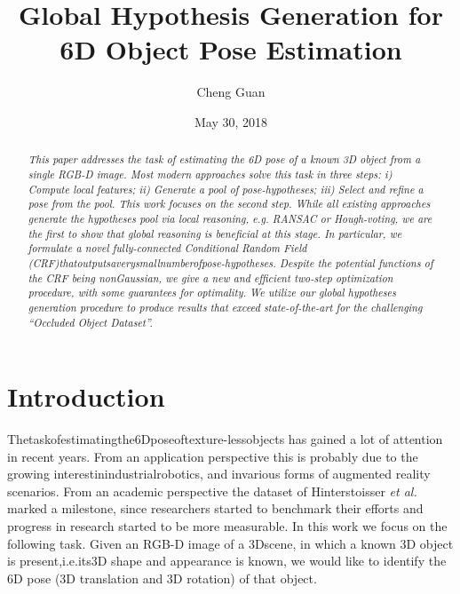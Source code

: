 \documentclass[10pt,twocolumn,a4paper]{article}
\title{Global Hypothesis Generation for 6D Object Pose Estimation}
\author{Cheng Guan}
\date{May 30, 2018}
\begin{document}
\maketitle
\begin{abstract}
  \emph{This paper addresses the task of estimating the 6D pose of a known 3D object
  from a single RGB-D image. Most modern approaches solve this task in three steps:
   i) Compute local features; ii) Generate a pool of pose-hypotheses; iii)
   Select and reﬁne a pose from the pool. This work focuses on the second step.
   While all existing approaches generate the hypotheses pool via local reasoning,
   e.g. RANSAC or Hough-voting, we are the ﬁrst to show that global reasoning
    is beneﬁcial at this stage. In particular, we formulate a novel fully-connected
     Conditional Random Field (CRF)thatoutputsaverysmallnumberofpose-hypotheses.
      Despite the potential functions of the CRF being nonGaussian, we give a new and
       efﬁcient two-step optimization procedure, with some guarantees for optimality.
   We utilize our global hypotheses generation procedure to produce results that
   exceed state-of-the-art for the challenging “Occluded Object Dataset”.}
\end{abstract}
\section{Introduction}
Thetaskofestimatingthe6Dposeoftexture-lessobjects has gained
a lot of attention in recent years. From an application perspective this
 is probably due to the growing interestinindustrialrobotics,
 and invarious forms of augmented reality scenarios.
 From an academic perspective the dataset of Hinterstoisser \emph{et al.} \cite{c1}
 marked a milestone, since researchers started to benchmark
 their efforts and progress in research started to be more measurable.
 In this work we focus on the following task. Given an RGB-D image of a 3Dscene,
 in which a known 3D object is present,i.e.its3D shape and appearance is known,
  we would like to identify the 6D pose (3D translation and 3D rotation)
  of that object.
\end{document}
